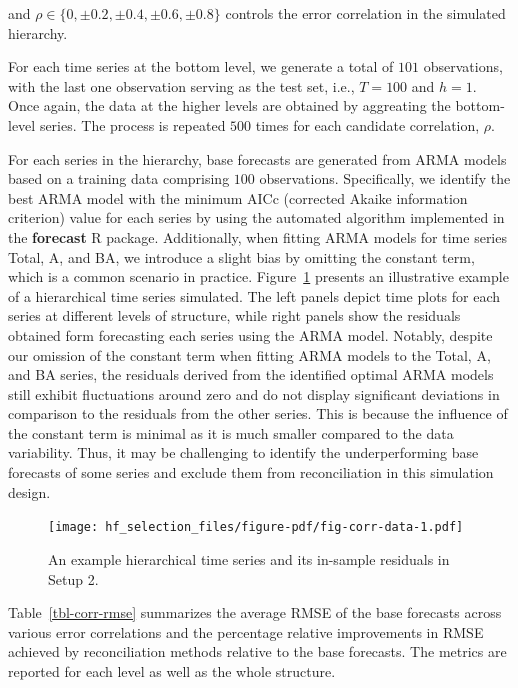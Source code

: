 \documentclass[11pt,a4paper,]{article}
\begin{document}
and \(\rho \in \{0, \pm 0.2, \pm 0.4, \pm 0.6, \pm 0.8\}\) controls the
error correlation in the simulated hierarchy.

For each time series at the bottom level, we generate a total of \(101\)
observations, with the last one observation serving as the test set,
i.e., \(T=100\) and \(h=1\). Once again, the data at the higher levels
are obtained by aggreating the bottom-level series. The process is
repeated \(500\) times for each candidate correlation, \(\rho\).

For each series in the hierarchy, base forecasts are generated from ARMA
models based on a training data comprising \(100\) observations.
Specifically, we identify the best ARMA model with the minimum AICc
(corrected Akaike information criterion) value for each series by using
the automated algorithm implemented in the \textbf{forecast} R package.
Additionally, when fitting ARMA models for time series Total, A, and BA,
we introduce a slight bias by omitting the constant term, which is a
common scenario in practice. Figure~\ref{fig-corr-data} presents an
illustrative example of a hierarchical time series simulated. The left
panels depict time plots for each series at different levels of
structure, while right panels show the residuals obtained form
forecasting each series using the ARMA model. Notably, despite our
omission of the constant term when fitting ARMA models to the Total, A,
and BA series, the residuals derived from the identified optimal ARMA
models still exhibit fluctuations around zero and do not display
significant deviations in comparison to the residuals from the other
series. This is because the influence of the constant term is minimal as
it is much smaller compared to the data variability. Thus, it may be
challenging to identify the underperforming base forecasts of some
series and exclude them from reconciliation in this simulation design.

\begin{figure}

{\centering \texttt{[image: hf\_selection\_files/figure-pdf/fig-corr-data-1.pdf]}

}

\caption{\label{fig-corr-data}An example hierarchical time series and
its in-sample residuals in Setup 2.}

\end{figure}

Table~\ref{tbl-corr-rmse} summarizes the average RMSE of the base
forecasts across various error correlations and the percentage relative
improvements in RMSE achieved by reconciliation methods relative to the
base forecasts. The metrics are reported for each level as well as the
whole structure.
\end{document}
